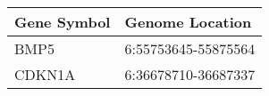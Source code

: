 \begin{tabular}{ll}
\toprule
Gene Symbol &     Genome Location \\
\midrule
       BMP5 & 6:55753645-55875564 \\
     CDKN1A & 6:36678710-36687337 \\
\bottomrule
\end{tabular}
